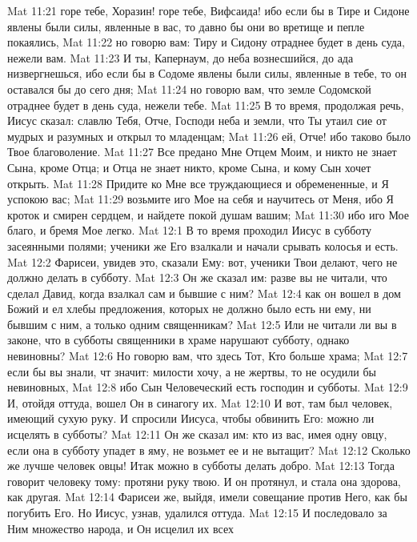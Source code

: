 \vs Mat 11:21 горе тебе, Хоразин! горе тебе, Вифсаида! ибо если бы в Тире и Сидоне явлены были силы, явленные в вас, то давно бы они во вретище и пепле покаялись,
\vs Mat 11:22 но говорю вам: Тиру и Сидону отраднее будет в день суда, нежели вам.
\vs Mat 11:23 И ты, Капернаум, до неба вознесшийся, до ада низвергнешься, ибо если бы в Содоме явлены были силы, явленные в тебе, то он оставался бы до сего дня;
\vs Mat 11:24 но говорю вам, что земле Содомской отраднее будет в день суда, нежели тебе.
\vs Mat 11:25 В то время, продолжая речь, Иисус сказал: славлю Тебя, Отче, Господи неба и земли, что Ты утаил сие от мудрых и разумных и открыл то младенцам;
\vs Mat 11:26 ей, Отче! ибо таково было Твое благоволение.
\rsbpar\vs Mat 11:27 Все предано Мне Отцем Моим, и никто не знает Сына, кроме Отца; и Отца не знает никто, кроме Сына, и кому Сын хочет открыть.
\vs Mat 11:28 Придите ко Мне все труждающиеся и обремененные, и Я успокою вас;
\vs Mat 11:29 возьмите иго Мое на себя и научитесь от Меня, ибо Я кроток и смирен сердцем, и найдете покой душам вашим;
\vs Mat 11:30 ибо иго Мое благо, и бремя Мое легко.
\vs Mat 12:1 В то время проходил Иисус в субботу засеянными полями; ученики же Его взалкали и начали срывать колосья и есть.
\vs Mat 12:2 Фарисеи, увидев это, сказали Ему: вот, ученики Твои делают, чего не должно делать в субботу.
\vs Mat 12:3 Он же сказал им: разве вы не читали, что сделал Давид, когда взалкал сам и бывшие с ним?
\vs Mat 12:4 как он вошел в дом Божий и ел хлебы предложения, которых не должно было есть ни ему, ни бывшим с ним, а только одним священникам?
\vs Mat 12:5 Или не читали ли вы в законе, что в субботы священники в храме нарушают субботу, однако невиновны?
\vs Mat 12:6 Но говорю вам, что здесь Тот, Кто больше храма;
\vs Mat 12:7 если бы вы знали, чт значит: милости хочу, а не жертвы, то не осудили бы невиновных,
\vs Mat 12:8 ибо Сын Человеческий есть господин и субботы.
\rsbpar\vs Mat 12:9 И, отойдя оттуда, вошел Он в синагогу их.
\vs Mat 12:10 И вот, там был человек, имеющий сухую руку. И спросили Иисуса, чтобы обвинить Его: можно ли исцелять в субботы?
\vs Mat 12:11 Он же сказал им: кто из вас, имея одну овцу, если она в субботу упадет в яму, не возьмет ее и не вытащит?
\vs Mat 12:12 Сколько же лучше человек овцы! Итак можно в субботы делать добро.
\vs Mat 12:13 Тогда говорит человеку тому: протяни руку твою. И он протянул, и стала она здорова, как другая.
\rsbpar\vs Mat 12:14 Фарисеи же, выйдя, имели совещание против Него, как бы погубить Его. Но Иисус, узнав, удалился оттуда.
\vs Mat 12:15 И последовало за Ним множество народа, и Он исцелил их всех
